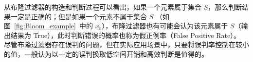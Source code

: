 


从布隆过滤器的构造和判断过程可以看出，如果一个元素属于集合 $S$，那么判断结果一定是正确的；但是如果一个元素不属于集合 $S$ （如图~\ref{fig:Bloom_example}~中的 $x_5$），布隆过滤器也有可能会认为该元素属于 $S$（输出结果为 True），此时判断错误的概率也称为假正例率（False Positive Rate）。
尽管布隆过滤器存在误判的问题，但在实际应用场景中，只要将误判率控制在较小的值，一般认为以一定的误判换取低空间开销和高效判断是值得的。

